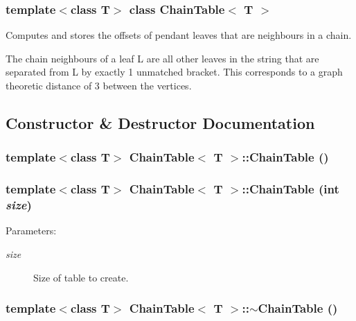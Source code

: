 \subsubsection*{template$<$class T$>$ class Chain\-Table$<$ T $>$}

Computes and stores the offsets of pendant leaves that are neighbours in a chain. 

The chain neighbours of a leaf L are all other leaves in the string that are separated from L by exactly 1 unmatched bracket. This corresponds to a graph theoretic distance of 3 between the vertices. 



\subsection{Constructor \& Destructor Documentation}
\subsubsection{\setlength{\rightskip}{0pt plus 5cm}template$<$class T$>$ {\bf Chain\-Table}$<$ T $>$::{\bf Chain\-Table} ()}\label{classChainTable_a0}


\subsubsection{\setlength{\rightskip}{0pt plus 5cm}template$<$class T$>$ {\bf Chain\-Table}$<$ T $>$::{\bf Chain\-Table} (int {\em size})}\label{classChainTable_a1}


\begin{Desc}
\item[Parameters:]
\begin{description}
\item[{\em size}]Size of table to create. \end{description}
\end{Desc}
\subsubsection{\setlength{\rightskip}{0pt plus 5cm}template$<$class T$>$ {\bf Chain\-Table}$<$ T $>$::$\sim${\bf Chain\-Table} ()}\label{classChainTable_a2}




